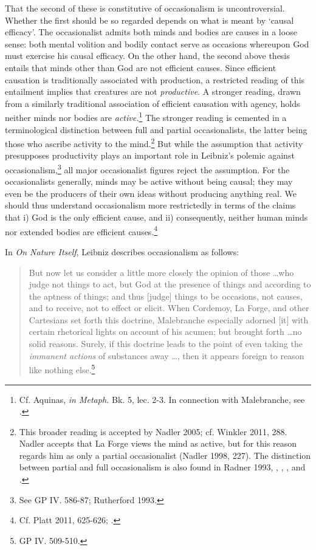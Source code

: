 \documentclass{article}
\begin{document}
That the second of these is constitutive of occasionalism is
uncontroversial. Whether the first should be so regarded depends on what
is meant by `causal efficacy'. The occasionalist admits both minds and
bodies are causes in a loose sense: both mental volition and bodily
contact serve as occasions whereupon God must exercise his causal
efficacy. On the other hand, the second above thesis entails that minds
other than God are not efficient causes. Since efficient causation is
traditionally associated with production, a restricted reading of this
entailment implies that creatures are not \emph{productive}. A stronger
reading, drawn from a similarly traditional association of efficient
causation with agency, holds neither minds nor bodies are
\emph{active.}\footnote{Cf. Aquinas, \emph{in Metaph.} Bk. 5, lec. 2-3.
  In connection with Malebranche, see \autocite[255-256]{Baker2005}.} The stronger
reading is cemented in a terminological distinction between full and
partial occasionalists, the latter being those who ascribe activity to
the mind.\footnote{This broader reading is accepted by Nadler 2005; cf.
  Winkler 2011, 288. Nadler accepts that La Forge views the mind as
  active, but for this reason regards him as only a partial
  occasionalist (Nadler 1998, 227). The distinction between partial and
  full occasionalism is also found in Radner 1993, \autocite{Garber1987}, \autocite{Clarke2000}, \autocite{Bardout2002}, and \autocite{Kolesnik2006}.} But while the
assumption that activity presupposes productivity plays an important
role in Leibniz's polemic against occasionalism,\footnote{See GP IV.
  586-87; Rutherford 1993.} all major occasionalist figures reject the
assumption. For the occasionalists generally, minds may be active
without being causal; they may even be the producers of their own ideas
without producing anything real. We should thus understand occasionalism
more restrictedly in terms of the claims that i) God is the only
efficient cause, and ii) consequently, neither human minds nor extended
bodies are efficient causes.\footnote{Cf. Platt 2011, 625-626; \autocite[101]{Gouhier1926}.}

In \emph{On Nature Itself}, Leibniz describes occasionalism as follows:

\begin{quote}
But now let us consider a little more closely the opinion of those
\ldots who judge not things to act, but God at the presence of
things and according to the aptness of things; and thus {[}judge{]}
things to be occasions, not causes, and to receive, not to effect or
elicit. When Cordemoy, La Forge, and other Cartesians set forth this
doctrine, Malebranche especially adorned {[}it{]} with certain
rhetorical lights on account of his acumen; but brought forth
\ldots no solid reasons. Surely, if this doctrine leads to the
point of even taking the \emph{immanent actions} of substances away
\ldots, then it appears foreign to reason like nothing
else.\footnote{GP IV. 509-510.}
\end{quote}
\end{document}
